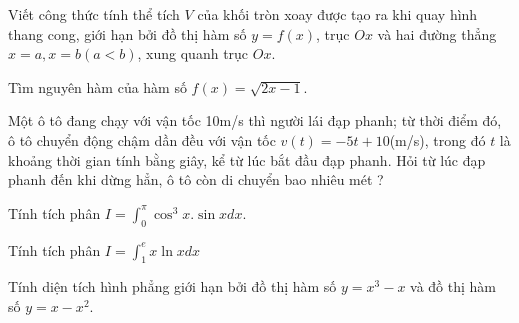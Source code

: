 \begin{vnmultiplechoice}[ rearrange=yes, keycolumns=5]
\begin{question} %
Viết công thức tính thể tích $V$ của khối tròn xoay được tạo ra khi quay hình
thang cong, giới hạn bởi đồ thị hàm số $y=f(x)$, trục $Ox$ và hai đường thẳng $x = a, x = b
(a < b)$, xung quanh trục $Ox$.
\datcot
\bonpa
{}
{}
{}
{}
\end{question}



\begin{question} %
Tìm nguyên hàm của hàm số $f(x)=\sqrt{2x-1}$.
\datcot
\bonpa
{}
{}
{}
{}
\end{question}

\begin{question} %
 Một ô tô đang chạy với vận tốc 10m/s thì người lái đạp phanh; từ thời điểm đó, ô
tô chuyển động chậm dần đều với vận tốc  $v(t)=-5t+10$(m/s), trong đó $t$ là khoảng thời
gian tính bằng giây, kể từ lúc bắt đầu đạp phanh. Hỏi từ lúc đạp phanh đến khi dừng hẳn, ô
tô còn di chuyển bao nhiêu mét ?
\datcot
\bonpa
{}
{}
{}
{}
\end{question}

\begin{question} %
 Tính tích phân $I=\displaystyle\int_0^{\pi}\cos^3 x. \sin x dx$.
\datcot
\bonpa
{}
{}
{}
{}
\end{question}

\begin{question} %
Tính tích phân $I=\displaystyle\int_1^e x\ln x dx$
\datcot
\bonpa
{}
{}
{}
{}
\end{question}

\begin{question}%
Tính diện tích hình phẳng giới hạn bởi đồ thị hàm số $y=x^3-x$ và đồ thị hàm
số $y=x-x^2$.
\datcot
\bonpa
{}
{}
{}
{}
\end{question}


\end{vnmultiplechoice}
